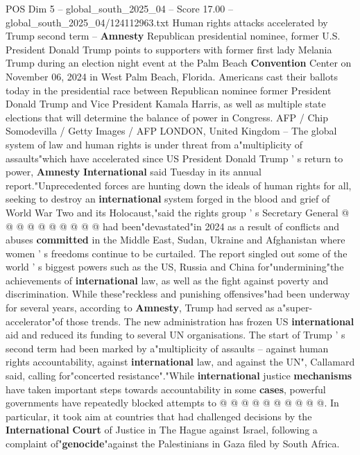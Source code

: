 \begin{textsample}{POS Dim 5 – global\_south\_2025\_04 – Score 17.00 – global\_south\_2025\_04/124112963.txt}  \label{ex:f5_pos_086}
Human rights attacks accelerated by Trump second term -- \textbf{Amnesty} Republican presidential nominee, former U.S.
President Donald Trump points to supporters with former first lady Melania Trump during an election night event at the Palm Beach \textbf{Convention} Center on November 06, 2024 in West Palm Beach, Florida.
Americans cast their ballots today in the presidential race between Republican nominee former President Donald Trump and Vice President Kamala Harris, as well as multiple state elections that will determine the balance of power in Congress.
AFP / Chip Somodevilla / Getty Images / AFP LONDON, United Kingdom -- The global system of law and human rights is under threat from a"multiplicity of assaults"which have accelerated since US President Donald Trump ' s return to power, \textbf{Amnesty} \textbf{International} said Tuesday in its annual report."Unprecedented forces are hunting down the ideals of human rights for all, seeking to destroy an \textbf{international} system forged in the blood and grief of World War Two and its Holocaust,"said the rights group ' s Secretary General @ @ @ @ @ @ @ @ @ @ had been"devastated"in 2024 as a result of conflicts and abuses \textbf{committed} in the Middle East, Sudan, Ukraine and Afghanistan where women ' s freedoms continue to be curtailed.
The report singled out some of the world ' s biggest powers such as the US, Russia and China for"undermining"the achievements of \textbf{international} law, as well as the fight against poverty and discrimination.
While these"reckless and punishing offensives"had been underway for several years, according to \textbf{Amnesty}, Trump had served as a"super-accelerator"of those trends.
The new administration has frozen US \textbf{international} aid and reduced its funding to several UN organisations.
The start of Trump ' s second term had been marked by a"multiplicity of assaults -- against human rights accountability, against \textbf{international} law, and against the UN", Callamard said, calling for"concerted resistance"."While \textbf{international} justice \textbf{mechanisms} have taken important steps towards accountability in some \textbf{cases}, powerful governments have repeatedly blocked attempts to @ @ @ @ @ @ @ @ @ @.
In particular, it took aim at countries that had challenged decisions by the \textbf{International} \textbf{Court} of Justice in The Hague against Israel, following a complaint of"\textbf{genocide}"against the Palestinians in Gaza filed by South Africa.

\end{textsample}
